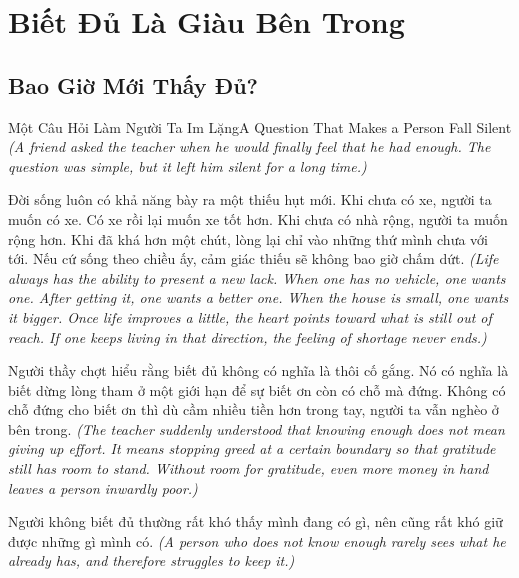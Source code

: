 \chapter{Biết Đủ Là Giàu Bên Trong}

\section{Bao Giờ Mới Thấy Đủ?}
\begin{truyen}{Một Câu Hỏi Làm Người Ta Im Lặng}{A Question That Makes a Person Fall Silent}
\textit{(A friend asked the teacher when he would finally feel that he had enough. The question was simple, but it left him silent for a long time.)}

Đời sống luôn có khả năng bày ra một thiếu hụt mới. Khi chưa có xe, người ta muốn có xe. Có xe rồi lại muốn xe tốt hơn. Khi chưa có nhà rộng, người ta muốn rộng hơn. Khi đã khá hơn một chút, lòng lại chỉ vào những thứ mình chưa với tới. Nếu cứ sống theo chiều ấy, cảm giác thiếu sẽ không bao giờ chấm dứt.
\textit{(Life always has the ability to present a new lack. When one has no vehicle, one wants one. After getting it, one wants a better one. When the house is small, one wants it bigger. Once life improves a little, the heart points toward what is still out of reach. If one keeps living in that direction, the feeling of shortage never ends.)}

Người thầy chợt hiểu rằng biết đủ không có nghĩa là thôi cố gắng. Nó có nghĩa là biết dừng lòng tham ở một giới hạn để sự biết ơn còn có chỗ mà đứng. Không có chỗ đứng cho biết ơn thì dù cầm nhiều tiền hơn trong tay, người ta vẫn nghèo ở bên trong.
\textit{(The teacher suddenly understood that knowing enough does not mean giving up effort. It means stopping greed at a certain boundary so that gratitude still has room to stand. Without room for gratitude, even more money in hand leaves a person inwardly poor.)}
\end{truyen}

\begin{baihoc}
Người không biết đủ thường rất khó thấy mình đang có gì, nên cũng rất khó giữ được những gì mình có.
\textit{(A person who does not know enough rarely sees what he already has, and therefore struggles to keep it.)}
\end{baihoc}


